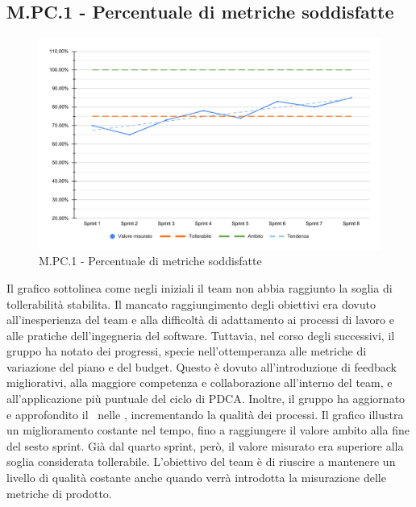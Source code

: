 \subsection{M.PC.1 - Percentuale di metriche soddisfatte}
\begin{figure}[H]
    \centering
    \includegraphics[width=\textwidth]{assets/metriche_soddisfatte.pdf}
    \caption{M.PC.1 - Percentuale di metriche soddisfatte}
\end{figure}

\par Il grafico sottolinea come negli  iniziali il team non abbia raggiunto la soglia di tollerabilità stabilita. Il mancato raggiungimento degli obiettivi era dovuto all’inesperienza del team e alla difficoltà di adattamento ai processi di lavoro e alle pratiche dell’ingegneria del software. Tuttavia, nel corso degli  successivi, il gruppo ha notato dei progressi, specie nell’ottemperanza alle metriche di variazione del piano e del budget. Questo è dovuto all'introduzione di feedback migliorativi, alla maggiore competenza e collaborazione all'interno del team, e all’applicazione più puntuale del ciclo di PDCA. Inoltre, il gruppo ha aggiornato e approfondito il \WoW\ nelle \NdP, incrementando la qualità dei processi. Il grafico illustra un miglioramento costante nel tempo, fino a raggiungere il valore ambito alla fine del sesto sprint. Già dal quarto sprint, però, il valore misurato era superiore alla soglia considerata tollerabile. L’obiettivo del team è di riuscire a mantenere un livello di qualità costante anche quando verrà introdotta la misurazione delle metriche di prodotto.
